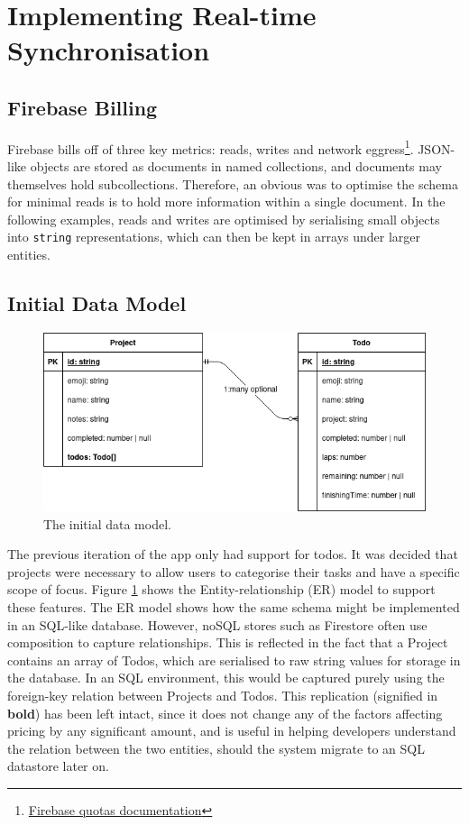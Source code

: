 \section{Implementing Real-time Synchronisation}
\subsection{Firebase Billing}
Firebase bills off of three key metrics: reads, writes and network eggress\footnote{\href{https://cloud.google.com/firestore/quotas}{Firebase quotas documentation}}. JSON-like objects are stored as documents in named collections, and documents may themselves hold subcollections. Therefore, an obvious was to optimise the schema for minimal reads is to hold more information within a single document. In the following examples, reads and writes are optimised by serialising small objects into \texttt{string} representations, which can then be kept in arrays under larger entities.

\subsection{Initial Data Model}
\begin{figure}[h]
    \begin{center}
        \includegraphics[scale=0.5]{images/initial_data_model.png}
    \end{center}
    \caption{The initial data model.}
    \label{fig:initial_data_model}
\end{figure}

The previous iteration of the app only had support for todos. It was decided that projects were necessary to allow users to categorise their tasks and have a specific scope of focus. Figure \ref{fig:initial_data_model} shows the Entity-relationship (ER) model to support these features. The ER model shows how the same schema might be implemented in an SQL-like database. However, noSQL stores such as Firestore often use composition to capture relationships. This is reflected in the fact that a Project contains an array of Todos, which are serialised to raw string values for storage in the database. In an SQL environment, this would be captured purely using the foreign-key relation between Projects and Todos. This replication (signified in \textbf{bold}) has been left intact, since it does not change any of the factors affecting pricing by any significant amount, and is useful in helping developers understand the relation between the two entities, should the system migrate to an SQL datastore later on.

